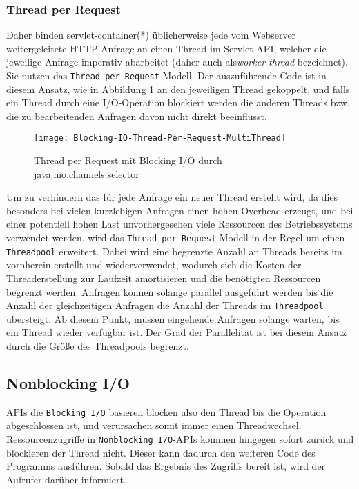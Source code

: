 \subsubsection{Thread per Request}
\label{subsubsec:thread per request}
Daher binden \Gls{servlet-container}(*) üblicherweise jede vom Webserver weitergeleitete HTTP-Anfrage an einen
Thread im Servlet-API, welcher die jeweilige Anfrage imperativ abarbeitet
(daher auch als\textit{worker thread} bezeichnet). Sie nutzen das \verb|Thread per Request|-Modell.
Der auszuführende Code ist in diesem Ansatz, wie in Abbildung \ref{fig:blocking_thread_per_request}
an den jeweiligen Thread gekoppelt, und falls ein Thread durch eine I/O-Operation blockiert werden
die anderen Threads bzw. die zu bearbeitenden Anfragen davon nicht direkt beeinflusst.
\begin{figure}[ht!]
  \centering
  \texttt{[image: Blocking-IO-Thread-Per-Request-MultiThread]}
  \caption{Thread per Request mit Blocking I/O durch java.nio.channels.selector \parencite{NettyInAction}}
  \label{fig:blocking_thread_per_request}
\end{figure}

Um zu verhindern das für jede Anfrage ein neuer Thread erstellt wird, da dies besonders bei vielen kurzlebigen
Anfragen einen hohen Overhead erzeugt, und bei einer potentiell hohen Last
unvorhergesehen viele Ressourcen des Betriebssystems verwendet werden, wird das \verb|Thread per Request|-Modell in der Regel um einen \verb|Threadpool| erweitert.
Dabei wird eine begrenzte Anzahl an Threads bereits im vornherein erstellt und wiederverwendet, wodurch sich die Kosten der Threaderstellung
zur Laufzeit amortisieren und die benötigten Ressourcen begrenzt werden.
Anfragen können solange parallel ausgeführt werden bis die Anzahl der gleichzeitigen Anfragen die
Anzahl der Threads im \verb|Threadpool| übersteigt.
Ab diesem Punkt, müssen eingehende Anfragen solange warten, bis ein Thread wieder verfügbar ist.
Der Grad der Parallelität ist bei diesem Ansatz durch die Größe des Threadpools begrenzt.
\newpage
\subsection{Nonblocking I/O}
\label{subsec:nonblocking-i/o}
APIs die \verb|Blocking I/O| basieren blocken also den Thread bis die Operation abgeschlossen ist, und verursachen somit
immer einen Threadwechsel.
Ressourcenzugriffe in \verb|Nonblocking I/O|-APIs kommen hingegen sofort zurück und blockieren der Thread nicht.
Dieser kann dadurch den weiteren Code des Programms ausführen.
Sobald das Ergebnis des Zugriffs bereit ist, wird der Aufrufer darüber informiert.

